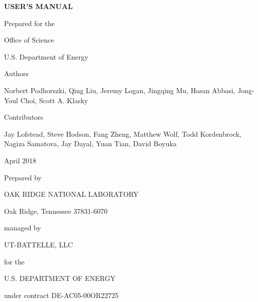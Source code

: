 \begin{center}
{\Large \textbf{\adiosversion USER'S MANUAL}}

\vspace{60pt}
Prepared for the

Office of Science

U.S. Department of Energy

\vspace{60pt}
Authors

\vspace{6pt}
Norbert Podhorszki, Qing Liu, Jeremy Logan, Jingqing Mu, Hasan Abbasi, Jong-Youl Choi, Scott A. Klasky

\vspace{30pt}
Contributors 

\vspace{6pt}
Jay Lofstead, Steve Hodson, Fang Zheng, Matthew Wolf, Todd Kordenbrock, Nagiza Samatova, Jay Dayal, Yuan Tian, David Boyuka

\vspace{72pt}
April  2018

\vspace{72pt}
Prepared by

OAK RIDGE NATIONAL LABORATORY

Oak Ridge, Tennessee 37831-6070

managed by

UT-BATTELLE, LLC

for the

U.S. DEPARTMENT OF ENERGY

under contract DE-AC05-00OR22725

\end{center}


\newpage

\tableofcontents


\newpage

\listoffigures


\newpage

